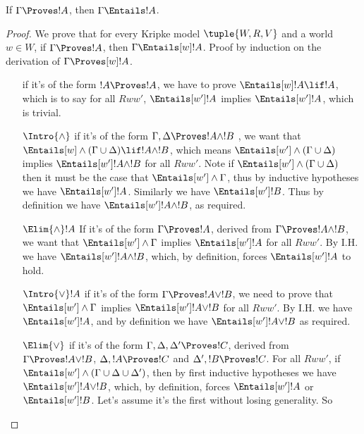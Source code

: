 \documentclass[../../../include/open-logic-section]{subfiles}
\begin{document}
\begin{lem}[Soundness]
  If $\Gamma \Proves !A$, then $ \Gamma \Entails !A$.
\end{lem}
\begin{proof}
  We prove that for every Kripke model $\tuple{W,R,V}$ and a world $w
  \in W$, if $\Gamma \Proves !A$, then $\Gamma \Entails[w] !A$. Proof
  by induction on the derivation of $\Gamma \Proves[w] !A$.
  
  \begin{enumerate}
    \item[] if it's of the form $!A \Proves !A$, we have to
      prove $\Entails[w] !A \lif !A$, which is to say
      for all $R w w'$, $\Entails[w'] !A$ implies
      $\Entails[w'] !A$, which is trivial.
    \item[$\Intro{\land}$] if it's of the form $\Gamma,\Delta \Proves !A
      \land !B$ , we want that $\Entails[w]
      \land(\Gamma \cup \Delta) \lif !A \land !B$, which means $\Entails[w'] \land(\Gamma \cup \Delta)$
      implies $\Entails[w'] !A \land !B$ for all $R w w'$. Note if
      $\Entails[w'] \land(\Gamma \cup \Delta)$ then it must be the
      case that $\Entails[w'] \land\Gamma$, thus by inductive
      hypotheses we have $\Entails[w'] !A$. Similarly we have
      $\Entails[w'] !B$. Thus by definition we have $\Entails[w'] !A
      \land !B$, as required.
    \item[$\Elim{\land}!A$] If it's of the form $\Gamma \Proves !A$,
      derived from $\Gamma \Proves !A \land !B$, we
      want that $\Entails[w'] \land\Gamma$ implies
      $\Entails[w'] !A$ for all $R w w'$. By I.H. we have
      $\Entails[w'] !A \land !B$, which, by definition, forces
      $\Entails[w'] !A$ to hold. 
    \item[$\Intro{\lor}!A$] if it's of the form $\Gamma \Proves !A \lor
      !B$, we need to prove that $\Entails[w'] \land \Gamma$ implies
      $\Entails[w'] !A \lor !B$ for all $R w w'$. By I.H. we have
      $\Entails[w'] !A$, and by definition we have $\Entails[w'] !A
      \lor !B$ as required.
    \item[$\Elim{\lor}$] if it's of the form $\Gamma, \Delta, \Delta'
      \Proves !C$, derived from $\Gamma \Proves !A \lor !B$, $\Delta,
      !A \Proves !C$ and $\Delta', !B \Proves !C$. For all $R w w'$,
      if $\Entails[w'] \land(\Gamma \cup \Delta \cup \Delta')$, then
      by first inductive hypotheses  we have $\Entails[w'] !A \lor !B$,
      which, by definition, forces $\Entails[w'] !A$ or $\Entails[w']
      !B$. Let's assume it's the first without losing generality. So

\end{enumerate}
\end{proof}
\end{document}
